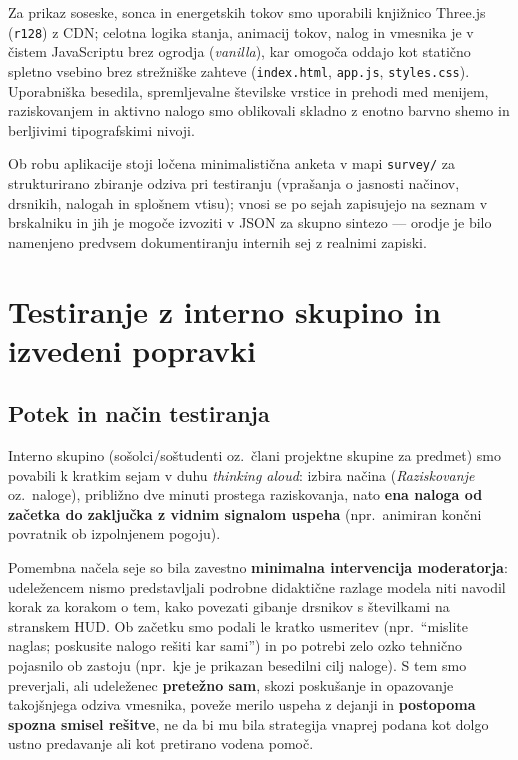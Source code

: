 \documentclass[a4paper,11pt]{article}
\begin{document}
Za prikaz soseske, sonca in energetskih tokov smo uporabili knjižnico Three.js (\texttt{r128}) z CDN; celotna logika stanja, animacij tokov, nalog in vmesnika je v čistem JavaScriptu brez ogrodja (\emph{vanilla}), kar omogoča oddajo kot statično spletno vsebino brez strežniške zahteve (\texttt{index.html}, \texttt{app.js}, \texttt{styles.css}). Uporabniška besedila, spremljevalne številske vrstice in prehodi med menijem, raziskovanjem in aktivno nalogo smo oblikovali skladno z enotno barvno shemo in berljivimi tipografskimi nivoji.

Ob robu aplikacije stoji ločena minimalistična anketa v mapi \texttt{survey/} za strukturirano zbiranje odziva pri testiranju (vprašanja o jasnosti načinov, drsnikih, nalogah in splošnem vtisu); vnosi se po sejah zapisujejo na seznam v brskalniku in jih je mogoče izvoziti v JSON za skupno sintezo --- orodje je bilo namenjeno predvsem dokumentiranju internih sej z realnimi zapiski.

\section*{Testiranje z interno skupino in izvedeni popravki}
\subsection*{Potek in način testiranja}
Interno skupino (sošolci/soštudenti oz.\ člani projektne skupine za predmet) smo povabili k kratkim sejam v duhu \emph{thinking aloud}: izbira načina (\emph{Raziskovanje} oz.\ naloge), približno dve minuti prostega raziskovanja, nato \textbf{ena naloga od začetka do zaključka z vidnim signalom uspeha} (npr.\ animiran končni povratnik ob izpolnjenem pogoju).

Pomembna načela seje so bila zavestno \textbf{minimalna intervencija moderatorja}: udeležencem nismo predstavljali podrobne didaktične razlage modela niti navodil korak za korakom o tem, kako povezati gibanje drsnikov s številkami na stranskem HUD. Ob začetku smo podali le kratko usmeritev (npr.\ ``mislite naglas; poskusite nalogo rešiti kar sami'') in po potrebi zelo ozko tehnično pojasnilo ob zastoju (npr.\ kje je prikazan besedilni cilj naloge). S tem smo preverjali, ali udeleženec \textbf{pretežno sam}, skozi poskušanje in opazovanje takojšnjega odziva vmesnika, poveže merilo uspeha z dejanji in \textbf{postopoma spozna smisel rešitve}, ne da bi mu bila strategija vnaprej podana kot dolgo ustno predavanje ali kot pretirano vodena pomoč.
\end{document}
